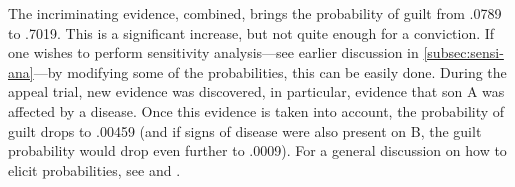 \documentclass{article}
\begin{document}
\noindent 
The incriminating evidence, combined, brings the probability of guilt from .0789 to .7019. This is a significant increase, but not quite enough for a conviction. If one wishes to perform sensitivity analysis---see earlier discussion in \ref{subsec:sensi-ana}---by modifying some of the probabilities, this can be easily done.
%
During the appeal trial, new evidence was discovered, in particular, evidence that son A was affected by a disease. 
Once this evidence is taken into account, the probability of guilt drops to .00459  (and if signs of disease were also present on B, the guilt probability would drop even further to .0009). For a general discussion on how to elicit probabilities, see \citep{renooij2001ProbabilityElicitationBeliefa} and
\citep{gaag2013elicit}.








\end{document}
